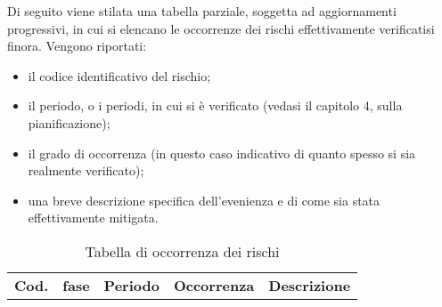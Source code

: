\hypertarget{Tabellaoccorrenzarischi}{}
Di seguito viene stilata una tabella parziale, soggetta ad aggiornamenti progressivi, in cui si elencano le occorrenze dei rischi effettivamente verificatisi finora. Vengono riportati:
\begin{itemize}
    \item il codice identificativo del rischio;
    \item il periodo, o i periodi, in cui si è verificato (vedasi il capitolo 4, sulla pianificazione);
    \item il grado di occorrenza (in questo caso indicativo di quanto spesso si sia realmente verificato);
    \item una breve descrizione specifica dell'evenienza e di come sia stata effettivamente mitigata.
\end{itemize}
{
        \renewcommand{\arraystretch}{1.5}
        \centering
        \begin{longtable}{|p{0.8cm}|p{2cm}|p{0.8cm}|p{0.8cm}|p{7.6cm}|}
        \caption{Tabella di occorrenza dei rischi}\\
        \rowcolor{\primaryColor}
        \textcolor{\secondaryColor}{\textbf{Cod.}} & 
        \textcolor{\secondaryColor}{\textbf{fase}} & 
        \textcolor{\secondaryColor}{\textbf{Periodo}} & 
        \textcolor{\secondaryColor}{\textbf{Occorrenza}} & 
        \textcolor{\secondaryColor}{\textbf{Descrizione}}\\
       

\end{longtable}}
